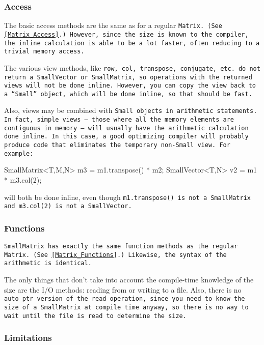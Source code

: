 \subsubsection{Access}
\label{SmallMatrix_Access}

The basic access methods are the same as for a regular \tt{Matrix}.
(See \ref{Matrix_Access}.)
However, since the size is known to the compiler, the inline calculation is able
to be a lot faster, often reducing to a trivial memory access.

The various view methods, like \tt{row}, \tt{col}, \tt{transpose}, \tt{conjugate}, etc. 
do not return a \tt{SmallVector} or \tt{SmallMatrix}, so operations 
with the returned views will not be done inline.
However, you can copy the view back to a ``\tt{Small}'' object, which will be done 
inline, so that should be fast.

Also, views may be combined with \tt{Small} objects in arithmetic statements.
In fact, simple views -- those where all the memory 
elements are contiguous in memory -- will usually have the arithmetic calculation
done inline.
In this case, a good optimizing compiler will probably produce code that 
eliminates the temporary
non-\tt{Small} view.  For example:
\begin{tmvcode}
SmallMatrix<T,M,N> m3 = m1.transpose() * m2;
SmallVector<T,N> v2 = m1 * m3.col(2);
\end{tmvcode}
will both be done inline, even though \tt{m1.transpose()} is not a \tt{SmallMatrix} and
\tt{m3.col(2)} is not a \tt{SmallVector}.

\subsubsection{Functions}
\label{SmallMatrix_Functions}

\tt{SmallMatrix} has exactly the same
function methods as the regular \tt{Matrix}.  
(See \ref{Matrix_Functions}.)
Likewise, the syntax of the
arithmetic is identical. 

The only things that don't take into account the 
compile-time knowledge of the size are the I/O methods:
reading from or writing to a file.
Also, there is no \tt{auto\_ptr} 
version of the read operation, since you need to know the 
size of a \tt{SmallMatrix} at compile time anyway, 
so there is no way to wait until the file is read to determine the size.

\subsubsection{Limitations}
\label{SmallMatrix_Limitations}

